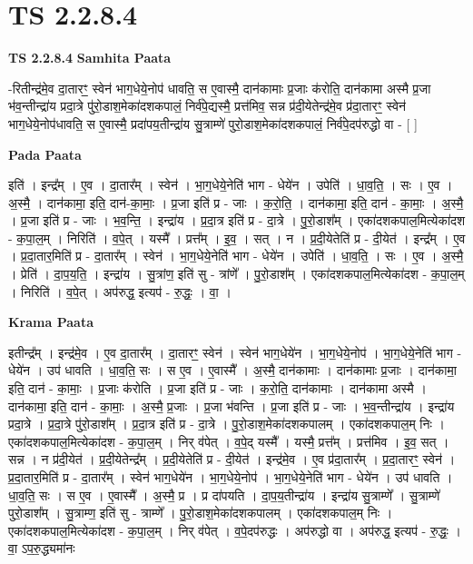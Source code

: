\documentclass[17pt]{extarticle}
\begin{document}
\section{ TS 2.2.8.4 }

\textbf{TS 2.2.8.4 } \newline
\textbf{Samhita Paata} \newline

-रितीन्द्र॑मे॒व दा॒तारꣳ॒॒ स्वेन॑ भाग॒धेये॒नोप॑ धावति॒ स ए॒वास्मै॒ दान॑कामाः प्र॒जाः क॑रोति॒ दान॑कामा अस्मै प्र॒जा भ॑व॒न्तीन्द्रा॑य प्रदा॒त्रे पु॑रो॒डाश॒मेका॑दशकपालं॒ निर्व॑पे॒द्यस्मै॒ प्रत्त॑मिव॒ सन्न प्र॑दी॒येतेन्द्र॑मे॒व प्र॑दा॒तारꣳ॒॒ स्वेन॑ भाग॒धेये॒नोप॑धावति॒ स ए॒वास्मै॒ प्रदा॑पय॒तीन्द्रा॑य सु॒त्राम्णे॑ पुरो॒डाश॒मेका॑दशकपालं॒ निर्व॑पे॒दप॑रुद्धो वा - [  ] \newline

\textbf{Pada Paata} \newline

इति॑ । इन्द्र᳚म् । ए॒व । दा॒तार᳚म् । स्वेन॑ । भा॒ग॒धेये॒नेति॑ भाग - धेये॑न । उपेति॑ । धा॒व॒ति॒ । सः । ए॒व । अ॒स्मै॒ । दान॑कामा॒ इति॒ दान॑-का॒माः॒ । प्र॒जा इति॑ प्र - जाः । क॒रो॒ति॒ । दान॑कामा॒ इति॒ दान॑ - का॒माः॒ । अ॒स्मै॒ । प्र॒जा इति॑ प्र - जाः । भ॒व॒न्ति॒ । इन्द्रा॑य । प्र॒दा॒त्र इति॑ प्र - दा॒त्रे । पु॒रो॒डाश᳚म् । एका॑दशकपाल॒मित्येका॑दश - क॒पा॒ल॒म् । निरिति॑ । व॒पे॒त् । यस्मै᳚ । प्रत्त᳚म् । इ॒व॒ । सत् । न । प्र॒दी॒येतेति॑ प्र - दी॒येत॑ । इन्द्र᳚म् । ए॒व । प्र॒दा॒तार॒मिति॑ प्र - दा॒तार᳚म् । स्वेन॑ । भा॒ग॒धेये॒नेति॑ भाग - धेये॑न । उपेति॑ । धा॒व॒ति॒ । सः । ए॒व । अ॒स्मै॒ । प्रेति॑ । दा॒प॒य॒ति॒ । इन्द्रा॑य । सु॒त्रांण॒ इति॑ सु - त्रांणे᳚ । पु॒रो॒डाश᳚म् । एका॑दशकपाल॒मित्येका॑दश - क॒पा॒ल॒म् । निरिति॑ । व॒पे॒त् । अप॑रुद्ध॒ इत्यप॑ - रु॒द्धः॒ । वा॒ ।  \newline


\textbf{Krama Paata} \newline

इतीन्द्र᳚म् । इन्द्र॑मे॒व । ए॒व दा॒तार᳚म् । दा॒तारꣳ॒॒ स्वेन॑ । स्वेन॑ भाग॒धेये॑न । भा॒ग॒धेये॒नोप॑ । भा॒ग॒धेये॒नेति॑ भाग - धेये॑न । उप॑ धावति । धा॒व॒ति॒ सः । स ए॒व । ए॒वास्मै᳚ । अ॒स्मै॒ दान॑कामाः । दान॑कामाः प्र॒जाः । दान॑कामा॒ इति॒ दान॑ - का॒माः॒ । प्र॒जाः क॑रोति । प्र॒जा इति॑ प्र - जाः । क॒रो॒ति॒ दान॑कामाः । दान॑कामा अस्मै । दान॑कामा॒ इति॒ दान॑ - का॒माः॒ । अ॒स्मै॒ प्र॒जाः । प्र॒जा भ॑वन्ति । प्र॒जा इति॑ प्र - जाः । भ॒व॒न्तीन्द्रा॑य । इन्द्रा॑य प्रदा॒त्रे । प्र॒दा॒त्रे पु॑रो॒डाश᳚म् । प्र॒दा॒त्र इति॑ प्र - दा॒त्रे । पु॒रो॒डाश॒मेका॑दशकपालम् । एका॑दशकपाल॒म् निः । एका॑दशकपाल॒मित्येका॑दश - क॒पा॒ल॒म् । निर् व॑पेत् । व॒पे॒द् यस्मै᳚ । यस्मै॒ प्रत्त᳚म् । प्रत्त॑मिव । इ॒व॒ सत् । सन्न । न प्र॑दी॒येत॑ । प्र॒दी॒येतेन्द्र᳚म् । प्र॒दी॒येतेति॑ प्र - दी॒येत॑ । इन्द्र॑मे॒व । ए॒व प्र॑दा॒तार᳚म् । प्र॒दा॒तारꣳ॒॒ स्वेन॑ । प्र॒दा॒तार॒मिति॑ प्र - दा॒तार᳚म् । स्वेन॑ भाग॒धेये॑न । भा॒ग॒धेये॒नोप॑ । भा॒ग॒धेये॒नेति॑ भाग - धेये॑न । उप॑ धावति । धा॒व॒ति॒ सः । स ए॒व । ए॒वास्मै᳚ । अ॒स्मै॒ प्र । प्र दा॑पयति । दा॒प॒य॒तीन्द्रा॑य । इन्द्रा॑य सु॒त्राम्णे᳚ । सु॒त्राम्णे॑ पुरो॒डाश᳚म् । सु॒त्राम्ण॒ इति॑ सु - त्राम्णे᳚ । पु॒रो॒डाश॒मेका॑दशकपालम् । एका॑दशकपाल॒म् निः । एका॑दशकपाल॒मित्येका॑दश - क॒पा॒ल॒म् । निर् व॑पेत् । व॒पे॒दप॑रुद्धः । अप॑रुद्धो वा । अप॑रुद्ध॒ इत्यप॑ - रु॒द्धः॒ । 
वा॒ ऽप॒रु॒द्ध्यमा॑नः \newline
\end{document}
